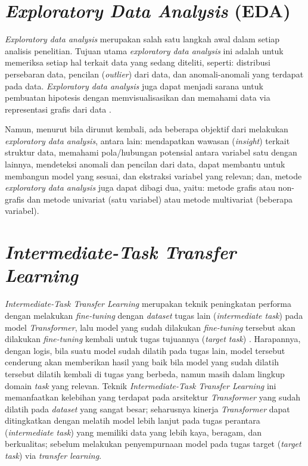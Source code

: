\section{\emph{Exploratory Data Analysis} (EDA)}
\emph{Exploratory data analysis} merupakan salah satu langkah awal dalam setiap analisis penelitian. Tujuan utama \emph{exploratory data analysis} ini adalah untuk memeriksa setiap hal terkait data yang sedang diteliti, seperti: distribusi persebaran data, pencilan (\emph{outlier}) dari data, dan anomali-anomali yang terdapat pada data. \emph{Exploratory data analysis} juga dapat menjadi sarana untuk pembuatan hipotesis dengan memvisualisasikan dan memahami data via representasi grafis dari data \citep{exploratory-data-analysis}. 

Namun, menurut \citet{exploratory-data-analysis} bila dirunut kembali, ada beberapa objektif dari melakukan \emph{exploratory data analysis}, antara lain: mendapatkan wawasan (\emph{insight}) terkait struktur data, memahami pola/hubungan potensial antara variabel satu dengan lainnya, mendeteksi anomali dan pencilan dari data, dapat membantu untuk membangun model yang sesuai, dan ekstraksi variabel yang relevan; dan, metode \emph{exploratory data analysis} juga dapat dibagi dua, yaitu: metode grafis atau non-grafis dan metode univariat (satu variabel) atau metode multivariat (beberapa variabel).

\section{\emph{Intermediate-Task Transfer Learning}}
\emph{Intermediate-Task Transfer Learning} merupakan teknik peningkatan performa dengan melakukan \emph{fine-tuning} dengan \emph{dataset} tugas lain (\emph{intermediate task}) pada model \emph{Transformer}, lalu model yang sudah dilakukan \emph{fine-tuning} tersebut akan dilakukan \emph{fine-tuning} kembali untuk tugas tujuannya (\emph{target task}) \citep{pruksachatkun-etal-2020-intermediate}. Harapannya, dengan logis, bila suatu model sudah dilatih pada tugas lain, model tersebut cenderung akan memberikan hasil yang baik bila model yang sudah dilatih tersebut dilatih kembali di tugas yang berbeda, namun masih dalam lingkup domain \emph{task} yang relevan. Teknik \emph{Intermediate-Task Transfer Learning} ini memanfaatkan kelebihan yang terdapat pada arsitektur \emph{Transformer} yang sudah dilatih pada \emph{dataset} yang sangat besar; seharusnya kinerja \emph{Transformer} dapat ditingkatkan dengan melatih model lebih lanjut pada tugas perantara (\emph{intermediate task}) yang memiliki data yang lebih kaya, beragam, dan berkualitas; sebelum melakukan penyempurnaan model pada tugas target (\emph{target task}) via \emph{transfer learning}. 

